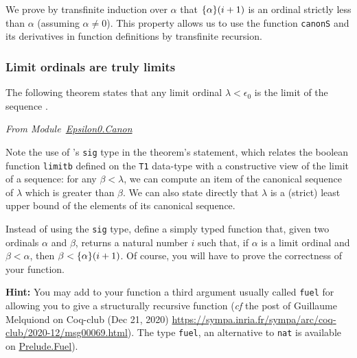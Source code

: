 
We prove by transfinite induction over $\alpha$ that $\mbox{$\{\alpha\}(i+1)$}$ is an ordinal strictly less than $\alpha$ (assuming $\alpha\not=0$). This property allows us to use the function \texttt{canonS} and its derivatives in function definitions by transfinite recursion.

\label{lemma:canonS_LT}



\subsubsection{Limit ordinals are truly limits}
The following theorem states that any limit ordinal $\lambda<\epsilon_0$ 
is the limit of the sequence .


\vspace{4pt}

\emph{From Module~\href{../theories/html/hydras.Epsilon0.Canon.html\#canonS_limit_strong}{Epsilon0.Canon}}





\label{lemma:canonS-limit}


Note the use of \coq's \texttt{sig} type in the theorem's statement, which
relates the boolean function \texttt{limitb} defined on the \texttt{T1} data-type with a constructive view of the limit of a sequence: for any $\beta<\lambda$, we can compute an item of the canonical sequence of $\lambda$ which is greater than $\beta$.
We can also state directly that $\lambda$ is a (strict) least upper bound of the elements of its canonical sequence.




\begin{exercise}\label{exo:simply-typed-canonseq}
Instead of using the \texttt{sig} type, define a simply typed function that, given two ordinals $\alpha$ and $\beta$, returns a natural number $i$ such that, if $\alpha$ is a limit ordinal and $\beta<\alpha$, then $\beta< \mbox{$\{\alpha\}(i+1)$}$. Of course, you will have to prove the correctness of your function. 

\textbf{Hint:} You may add to your function a third argument usually called \texttt{fuel} for allowing you to give a structurally 
recursive function (\emph{cf} the post of Guillaume Melquiond on Coq-club (Dec 21, 2020)
\url{https://sympa.inria.fr/sympa/arc/coq-club/2020-12/msg00069.html}).
The type \texttt{fuel}, an alternative 
to \texttt{nat} is available on \href{../theories/html/hydras.Prelude.Fuel.html}{Prelude.Fuel}).

\end{exercise}






